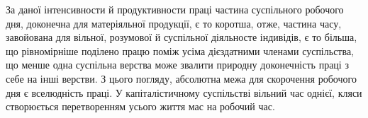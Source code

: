 За даної інтенсивности й продуктивности праці частина суспільного
робочого дня, доконечна для матеріяльної продукції,
є то коротша, отже, частина часу, завойована для вільної, розумової
й суспільної діяльносте індивідів, є то більша, що рівномірніше
поділено працю поміж усіма дієздатними членами суспільства,
що менше одна суспільна верства може звалити природну
доконечність праці з себе на інші верстви. З цього погляду,
абсолютна межа для скорочення робочого дня є вселюдність праці.
У капіталістичному суспільстві вільний час однієї, кляси створюється
перетворенням усього життя мас на робочий час.
